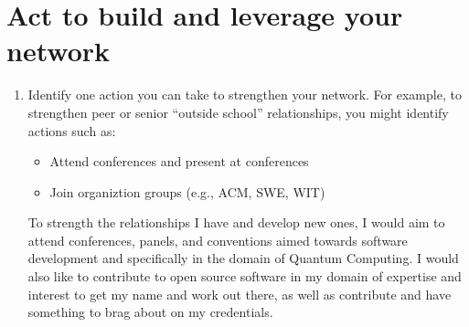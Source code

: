 \documentclass[12pt]{article}
\begin{document}
\section{Act to build and leverage your network}

\begin{enumerate}
    \item Identify one action you can take to strengthen your network. 
    For example, to strengthen peer or senior “outside school” relationships, 
    you might identify actions such as:
    \begin{itemize}
        \item Attend conferences and present at conferences
        \item Join organiztion groups (e.g., ACM, SWE, WIT)
    \end{itemize}

    To strength the relationships I have and develop new ones, I would aim to attend 
    conferences, panels, and conventions aimed towards software development and specifically 
    in the domain of Quantum Computing. I would also like to contribute to open source software 
    in my domain of expertise and interest to get my name and work out there, as well as 
    contribute and have something to brag about on my credentials.
\end{enumerate}
\end{document}
